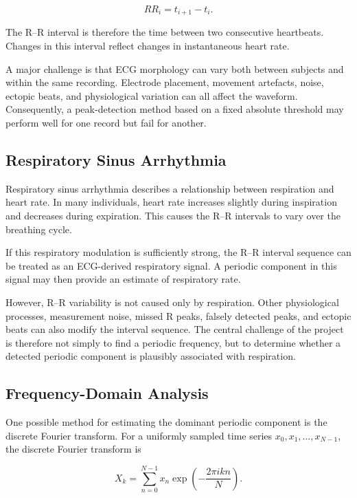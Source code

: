 \begin{equation}
RR_i = t_{i+1} - t_i.
\label{eq:rr_interval}
\end{equation}

The R--R interval is therefore the time between two consecutive heartbeats.
Changes in this interval reflect changes in instantaneous heart rate.

A major challenge is that ECG morphology can vary both between subjects and
within the same recording. Electrode placement, movement artefacts, noise,
ectopic beats, and physiological variation can all affect the waveform.
Consequently, a peak-detection method based on a fixed absolute threshold may
perform well for one record but fail for another.


\subsection{Respiratory Sinus Arrhythmia}
\label{subsec:rsa}

Respiratory sinus arrhythmia describes a relationship between respiration and
heart rate. In many individuals, heart rate increases slightly during
inspiration and decreases during expiration. This causes the R--R intervals
to vary over the breathing cycle.

If this respiratory modulation is sufficiently strong, the R--R interval
sequence can be treated as an ECG-derived respiratory signal. A periodic
component in this signal may then provide an estimate of respiratory rate.

However, R--R variability is not caused only by respiration. Other
physiological processes, measurement noise, missed R peaks, falsely detected
peaks, and ectopic beats can also modify the interval sequence. The central
challenge of the project is therefore not simply to find a periodic
frequency, but to determine whether a detected periodic component is
plausibly associated with respiration.


\subsection{Frequency-Domain Analysis}
\label{subsec:fft}

One possible method for estimating the dominant periodic component is the
discrete Fourier transform. For a uniformly sampled time series
$x_0, x_1, \ldots, x_{N-1}$, the discrete Fourier transform is

\begin{equation}
X_k =
\sum_{n=0}^{N-1}
x_n
\exp\left(
-\frac{2\pi i kn}{N}
\right).
\label{eq:dft}
\end{equation}


